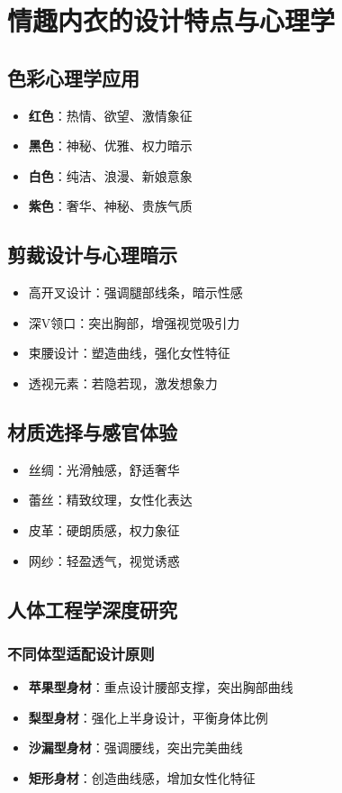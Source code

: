 \documentclass[12pt,UTF8]{ctexbook}
\begin{document}
\section{情趣内衣的设计特点与心理学}
\subsection{色彩心理学应用}
\begin{itemize}[leftmargin=2cm]
	\item \textbf{红色}：热情、欲望、激情象征
	\item \textbf{黑色}：神秘、优雅、权力暗示
	\item \textbf{白色}：纯洁、浪漫、新娘意象
	\item \textbf{紫色}：奢华、神秘、贵族气质
\end{itemize}

\subsection{剪裁设计与心理暗示}
\begin{itemize}[leftmargin=2cm]
	\item 高开叉设计：强调腿部线条，暗示性感
	\item 深V领口：突出胸部，增强视觉吸引力
	\item 束腰设计：塑造曲线，强化女性特征
	\item 透视元素：若隐若现，激发想象力
\end{itemize}

\subsection{材质选择与感官体验}
\begin{itemize}[leftmargin=2cm]
	\item 丝绸：光滑触感，舒适奢华
	\item 蕾丝：精致纹理，女性化表达
	\item 皮革：硬朗质感，权力象征
	\item 网纱：轻盈透气，视觉诱惑
\end{itemize}

\subsection{人体工程学深度研究}
\subsubsection{不同体型适配设计原则}
\begin{itemize}[leftmargin=2cm]
	\item \textbf{苹果型身材}：重点设计腰部支撑，突出胸部曲线
	\item \textbf{梨型身材}：强化上半身设计，平衡身体比例
	\item \textbf{沙漏型身材}：强调腰线，突出完美曲线
	\item \textbf{矩形身材}：创造曲线感，增加女性化特征
\end{itemize}
\end{document}
